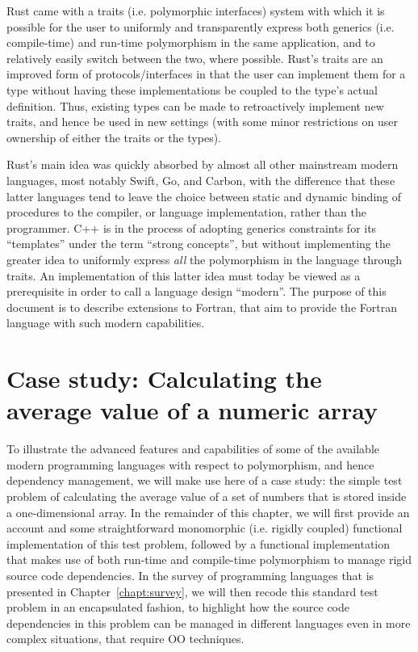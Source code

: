 \documentclass[11pt,oneside]{report}
\begin{document}
Rust came with a traits (i.e. polymorphic interfaces) system with which
it is possible for the user to uniformly and transparently express
both generics (i.e. compile-time) and run-time polymorphism in the
same application, and to relatively easily switch between the two,
where possible. Rust's traits are an improved form of
protocols/interfaces in that the user can implement them for a type
without having these implementations be coupled to the type's actual
definition. Thus, existing types can be made to retroactively
implement new traits, and hence be used in new settings (with some
minor restrictions on user ownership of either the traits or the
types).

Rust's main idea was quickly absorbed by almost all other mainstream
modern languages, most notably Swift, Go, and Carbon, with the
difference that these latter languages tend to leave the choice
between static and dynamic binding of procedures to the compiler, or
language implementation, rather than the programmer. C++ is in the
process of adopting generics constraints for its ``templates'' under
the term ``strong concepts'', but without implementing the greater
idea to uniformly express \emph{all} the polymorphism in the language
through traits. An implementation of this latter idea must today be
viewed as a prerequisite in order to call a language design
``modern''. The purpose of this document is to describe extensions to
Fortran, that aim to provide the Fortran language with such modern
capabilities.

\chapter{Case study: Calculating the average value of a numeric array}

To illustrate the advanced features and capabilities of some of the
available modern programming languages with respect to polymorphism,
and hence dependency management, we will make use here of a case
study: the simple test problem of calculating the average value of a
set of numbers that is stored inside a one-dimensional array. In the
remainder of this chapter, we will first provide an account and some
straightforward monomorphic (i.e. rigidly coupled) functional
implementation of this test problem, followed by a functional
implementation that makes use of both run-time and compile-time
polymorphism to manage rigid source code dependencies. In the survey
of programming languages that is presented in
Chapter~\ref{chapt:survey}, we will then recode this standard test
problem in an encapsulated fashion, to highlight how the source code
dependencies in this problem can be managed in different languages
even in more complex situations, that require OO techniques.
\end{document}
